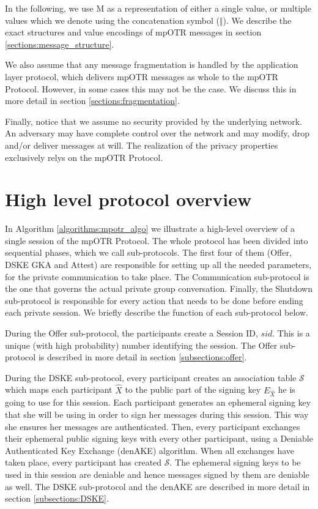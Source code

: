 In the following, we use M as a representation of either a single value, or multiple values which we denote using the concatenation symbol ($\Vert$). We describe the exact structures and value encodings of mpOTR messages in section \ref{sections:message_structure}.

We also assume that any message fragmentation is handled by the application layer protocol, which delivers mpOTR messages as whole to the mpOTR Protocol. However, in some cases this may not be the case. We discuss this in more detail in section \ref{sections:fragmentation}.

Finally, notice that we assume no security provided by the underlying network. An adversary may have complete control over the network and may modify, drop and/or deliver messages at will. The realization of the privacy properties exclusively relys on the mpOTR Protocol.

\section{High level protocol overview}
In Algorithm \ref{algorithms:mpotr_algo} we illustrate a high-level overview of a single session of the mpOTR Protocol. The whole protocol has been divided into sequential phases, which we call sub-protocols. The first four of them (Offer, DSKE GKA and Attest) are responsible for setting up all the needed parameters, for the private communication to take place. The Communication sub-protocol is the one that governs the actual private group conversation. Finally, the Shutdown sub-protocol is responsible for every action that needs to be done before ending each private session. We briefly describe the function of each sub-protocol below.

During the Offer sub-protocol, the participants create a Session ID, $sid$. This is a unique (with high probability) number identifying the session. The Offer sub-protocol is described in more detail in section \ref{subsections:offer}.

During the DSKE sub-protocol, every participant creates an association table $\mathcal{S}$ which maps each participant $\hat{X}$ to the public part of the signing key $E_{\hat{X}}$ he is going to use for this session. Each participant generates an ephemeral signing key that she will be using in order to sign her messages during this session. This way she ensures her messages are authenticated. Then, every participant exchanges their ephemeral public signing keys with every other participant, using a Deniable Authenticated Key Exchange (denAKE) algorithm. When all exchanges have taken place, every participant has created $\mathcal{S}$. The ephemeral signing keys to be used in this session are deniable and hence messages signed by them are deniable as well. The DSKE sub-protocol and the denAKE are described in more detail in section \ref{subsections:DSKE}.

